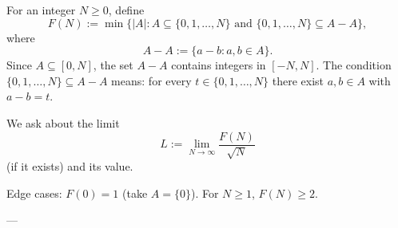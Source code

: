 For an integer $N\ge 0$, define
\[
F(N):=\min\bigl\{|A|: A\subseteq \{0,1,\dots,N\}\text{ and }\{0,1,\dots,N\}\subseteq A-A\bigr\},
\]
where
\[
A-A:=\{a-b: a,b\in A\}.
\]
Since $A\subseteq [0,N]$, the set $A-A$ contains integers in $[-N,N]$.
The condition $\{0,1,\dots,N\}\subseteq A-A$ means: for every $t\in\{0,1,\dots,N\}$ there exist $a,b\in A$ with $a-b=t$.

We ask about the limit
\[
L:=\lim_{N\to\infty}\frac{F(N)}{\sqrt N}
\]
(if it exists) and its value.

Edge cases: $F(0)=1$ (take $A=\{0\}$). For $N\ge 1$, $F(N)\ge 2$.

---

